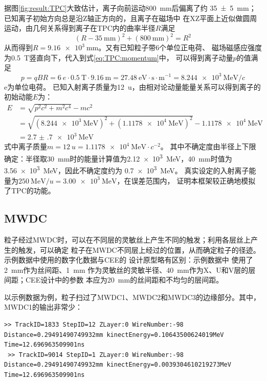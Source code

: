 \documentclass[bachelor,openany,oneside,color]{buaathesis}
\begin{document}
据图\ref{fig:result:TPC}大致估计，离子向前运动\SI{800}{\milli\meter}后偏离了约
\SI{35(5)}{\milli\meter}；已知离子初始方向总是沿Z轴正方向的，且离子在磁场中
在XZ平面上近似做圆周运动，由几何关系得到离子在TPC内的曲率半径$R$满足
\begin{equation}
(R-\SI{35}{\milli\meter})^2+(\SI{800}{\milli\meter})^2=R^2
\end{equation}
从而得到$R=\SI{9.16e3}{\milli\meter}$。又有已知粒子带6个单位正电荷、
磁场磁感应强度为\SI{0.5}{\tesla}竖直向下，代入到式\ref{eq:TPC:momentum}中，
可以得到离子动量$p$的值满足
\begin{equation}
p=q B R=\SI{6}{e}\cdot\SI{0.5}{\tesla}\cdot\SI{9.16}{\meter}=\SI{27.48}
{\eV\cdot\second\cdot\meter^{-1}}=\SI{8.244e3}{\mega\eV/c}
\end{equation}
\si{e}为单位电荷。
已知入射离子质量为\SI{12}{u}，由相对论动量能量关系可以得到离子的初始动能$E$为：
\begin{equation}
\begin{aligned}
E &	=\sqrt{p^2c^2+m^2c^4}-mc^2\\
& 	=\sqrt{(\SI{8.244e3}{\mega\eV})^2+
		(\SI{1.1178e4}{\mega\eV})^2}-\SI{1.1178e4}{\mega\eV}\\
&	=\SI{2.7(7)e3}{\mega\eV}
\end{aligned}\end{equation}
式中离子质量$m=\SI{12}{u}=\SI{1.1178e4}{\mega\eV\cdot{c}^{-2}}$。
其中不确定度由半径上下限确定：半径取\SI{30}{\milli\meter}时的能量计算值为\SI{2.12e3}
{\mega\eV}，\SI{40}{\milli\meter}时值为\SI{3.56e3}{\mega\eV}，因此不确定度约为
\SI{0.7e3}{\mega\eV}。
真实设定的入射离子能量为$\SI{250}{\mega\eV/u}=\SI{3.00e3}{\mega\eV}$，在误差范围内，
证明本框架较正确地模拟了TPC的功能。

\subsection{MWDC}

粒子经过MWDC时，可以在不同层的灵敏丝上产生不同的触发；利用各层丝上产生的触发，可以确定
粒子在MWDC不同层上经过的位置，从而确定粒子的径迹。示例数据中使用的数字化数据与CEE的
设计原型略有区别：示例数据中
使用了\SI{2}{\milli\meter}作为丝间距、\SI{1}{\milli\meter}
作为灵敏丝的灵敏半径、\SI{40}{\milli\meter}作为X、U和V层的层间距；CEE设计中的参数
本应为\SI{20}{\milli\meter}的丝间距和不均匀的层间距\cite{Lyu:ConceptDesign,
Yi:MWDC}。

以示例数据为例，粒子扫过了MWDC1、MWDC2和MWDC3的边缘部分。其中，MWDC1的输出非常少：

\begin{lstlisting}[caption={MWDC1},firstnumber=3709,lastline=3710]
 >> TrackID=1833 StepID=12 ZLayer:0 WireNumber:-98 Distance=0.29491490749932mm kinectEnergy=0.10643500624019MeV Time=12.696963509901ns
 >> TrackID=9014 StepID=1 ZLayer:0 WireNumber:-98 Distance=0.29491490749932mm kinectEnergy=0.0039304610219273MeV Time=12.696963509901ns
\end{lstlisting}
\end{document}
